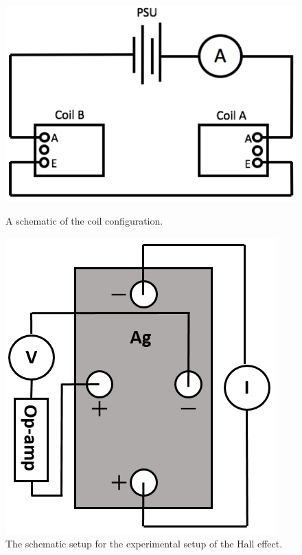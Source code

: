    \begin{figure}[!htbp]
    \begin{center}
        \begin{minipage}[t]{0.45\textwidth}
            \includegraphics[scale=0.35]{figuren/schematic_setup_magnets.png}
            \caption{A schematic of the coil configuration.} \label{fig:schematic_setup_magnets}
        \end{minipage}
        \begin{minipage}[t]{0.45\textwidth}
            \includegraphics[scale=0.5]{figuren/schematic_hall_voltage.png}
             \caption{The schematic setup for the experimental setup of the Hall effect.}\label{fig:schematic_hall_effect}
        \end{minipage}
    \end{center}
    \end{figure}
